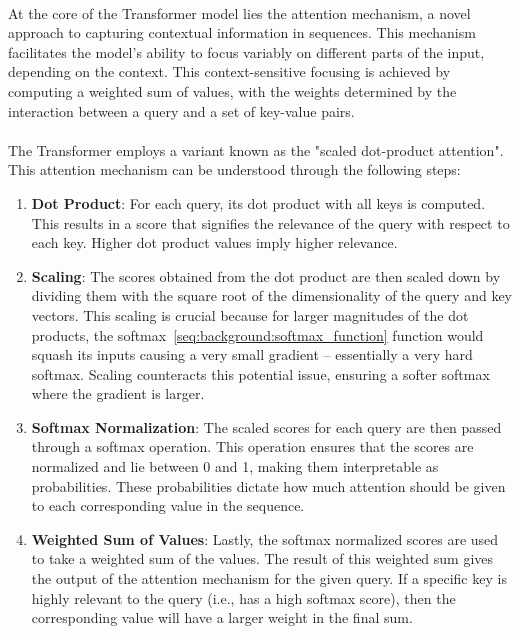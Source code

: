             \paragraph{}At the core of the Transformer model lies the attention mechanism, a novel approach to capturing contextual information in sequences. This mechanism facilitates the model's ability to focus variably on different parts of the input, depending on the context. This context-sensitive focusing is achieved by computing a weighted sum of values, with the weights determined by the interaction between a query and a set of key-value pairs.
        
            \paragraph{}The Transformer employs a variant known as the "scaled dot-product attention". This attention mechanism can be understood through the following steps:
        
            \begin{enumerate}
                \item \textbf{Dot Product}: For each query, its dot product with all keys is computed. This results in a score that signifies the relevance of the query with respect to each key. Higher dot product values imply higher relevance.
                
                \item \textbf{Scaling}: The scores obtained from the dot product are then scaled down by dividing them with the square root of the dimensionality of the query and key vectors. This scaling is crucial because for larger magnitudes of the dot products, the softmax~\ref{seq:background:softmax_function} function would squash its inputs causing a very small gradient – essentially a very hard softmax. Scaling counteracts this potential issue, ensuring a softer softmax where the gradient is larger.
                
                \item \textbf{Softmax Normalization}: The scaled scores for each query are then passed through a softmax operation. This operation ensures that the scores are normalized and lie between 0 and 1, making them interpretable as probabilities. These probabilities dictate how much attention should be given to each corresponding value in the sequence.
                
                \item \textbf{Weighted Sum of Values}: Lastly, the softmax normalized scores are used to take a weighted sum of the values. The result of this weighted sum gives the output of the attention mechanism for the given query. If a specific key is highly relevant to the query (i.e., has a high softmax score), then the corresponding value will have a larger weight in the final sum.
            \end{enumerate}
            
